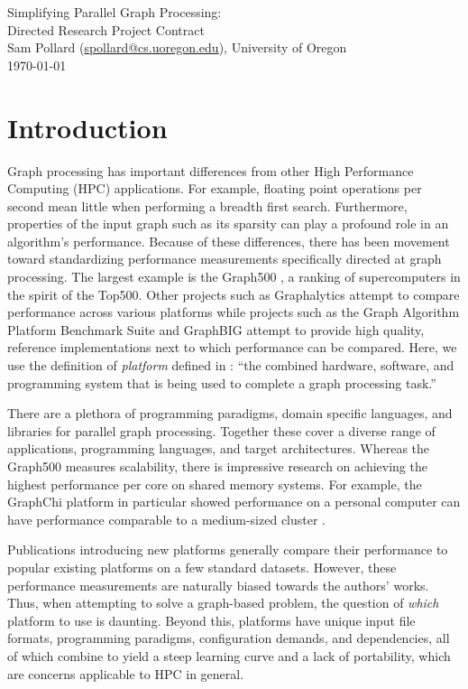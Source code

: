 \documentclass[11pt]{article}
\begin{document}
\begin{center}
{ \huge
	Simplifying Parallel Graph Processing: \\
}
{ \Large
	Directed Research Project Contract \\
}
Sam Pollard (\href{mailto:spollard@cs.uoregon.edu}{spollard@cs.uoregon.edu}), University of Oregon \\
\today
\end{center}

\section{Introduction}
Graph processing has important differences from other High Performance Computing (HPC) applications. For example, floating point operations per second mean little when performing a breadth first search. Furthermore, properties of the input graph such as its sparsity can play a profound role in an algorithm's performance.
Because of these differences, there has been movement toward standardizing performance measurements specifically directed at graph processing. The largest example is the Graph500 \cite{Murphy:2010:Graph500}, a ranking of supercomputers in the spirit of the Top500. Other projects such as Graphalytics \cite{Guo:2014:Graphalytics} attempt to compare performance across various platforms while projects such as the Graph Algorithm Platform Benchmark Suite \cite{Beamer:2016:GAP} and GraphBIG \cite{Nai:2015:Graphbig} attempt to provide high quality, reference implementations next to which performance can be compared. Here, we use the definition of \emph{platform} defined in \cite{Guo:2014:Graphalytics}: ``the combined hardware, software, and programming system that is being used to complete a graph processing task.''

There are a plethora of programming paradigms, domain specific languages, and libraries for parallel graph processing. Together these cover a diverse range of applications, programming languages, and target architectures. Whereas the Graph500 measures scalability, there is impressive research on achieving the highest performance per core on shared memory systems. For example, the GraphChi platform in particular showed performance on a personal computer can have performance comparable to a medium-sized cluster \cite{kyrola:2012:Graphchi}.

Publications introducing new platforms generally compare their performance to popular existing platforms on a few standard datasets. However, these performance measurements are naturally biased towards the authors' works. Thus, when attempting to solve a graph-based problem, the question of \emph{which} platform to use is daunting. Beyond this, platforms have unique input file formats, programming paradigms, configuration demands, and dependencies, all of which combine to yield a steep learning curve and a lack of portability, which are concerns applicable to HPC in general.
\end{document}
